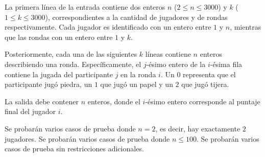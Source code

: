 \documentclass{oci}
\begin{document}
\begin{inputDescription}
  La primera línea de la entrada contiene dos enteros $n$ ($2 \leq n \leq 3000$)
  y $k$ ($1 \leq k \leq 3000$), correspondientes a la cantidad de jugadores y de
  rondas respectivamente.
  Cada jugador es identificado con un entero entre $1$ y $n$, mientras que las rondas
  con un entero entre $1$ y $k$.

  Posteriormente, cada una de las siguientes $k$ líneas contiene $n$ enteros describiendo
  una ronda.
  Específicamente, el $j$-ésimo entero de la $i$-ésima fila contiene la jugada
  del participante $j$ en la ronda $i$.
  Un $0$ representa que el participante jugó piedra, un $1$ que jugó un papel y un $2$
  que jugó tijera.
\end{inputDescription}

\begin{outputDescription}
  La salida debe contener $n$ enteros, donde el $i$-ésimo entero corresponde al
  puntaje final del jugador $i$.
\end{outputDescription}

\begin{scoreDescription}
   Se probarán varios casos de prueba donde $n = 2$, es decir, hay exactamente $2$ jugadores.
   Se probarán varios casos de prueba donde $n \leq 100$.
   Se probarán varios casos de prueba sin restricciones adicionales.
\end{scoreDescription}

\begin{sampleDescription}
\end{sampleDescription}
\end{document}
